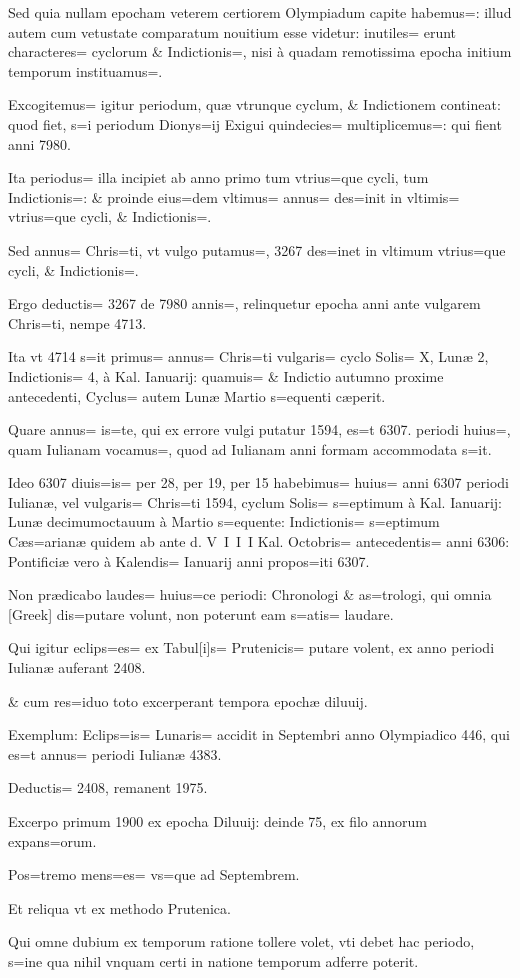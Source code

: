 \begin{parnumbers}

Sed quia nullam epocham veterem certiorem Olympiadum capite habemus=: illud autem  cum vetustate comparatum nouitium esse videtur: inutiles= erunt characteres= cyclorum \& Indictionis=, nisi à quadam remotissima epocha initium temporum instituamus=.

Excogitemus= igitur periodum, quæ vtrunque cyclum, \& Indictionem contineat: quod fiet, s=i periodum Dionys=ij Exigui quindecies= multiplicemus=: qui fient anni 7980.

Ita periodus= illa incipiet ab anno primo tum vtrius=que cycli, tum Indictionis=: \& proinde eius=dem vltimus= annus= des=init in vltimis= vtrius=que cycli, \& Indictionis=.

Sed annus= Chris=ti, vt vulgo putamus=, 3267 des=inet in vltimum vtrius=que cycli, \& Indictionis=.

Ergo deductis= 3267 de 7980 annis=, relinquetur epocha anni ante vulgarem  Chris=ti, nempe 4713.

Ita vt 4714 s=it primus= annus= Chris=ti vulgaris= cyclo Solis= X, Lunæ 2, Indictionis= 4, à Kal. Ianuarij: quamuis= \& Indictio autumno proxime antecedenti, Cyclus= autem Lunæ Martio s=equenti cæperit.

Quare annus= is=te, qui ex errore vulgi putatur 1594, es=t 6307. periodi huius=, quam Iulianam vocamus=, quod ad Iulianam anni formam accommodata s=it.

Ideo 6307 diuis=is= per 28, per 19, per 15 habebimus= huius= anni 6307 periodi Iulianæ, vel vulgaris= Chris=ti 1594, cyclum Solis= s=eptimum à Kal. Ianuarij: Lunæ decimumoctauum à Martio s=equente: Indictionis= s=eptimum Cæs=arianæ quidem ab ante d. V I I I Kal. Octobris= antecedentis= anni 6306: Pontificiæ vero à  Kalendis= Ianuarij anni propos=iti 6307.

Non prædicabo laudes= huius=ce periodi: Chronologi \& as=trologi, qui omnia [Greek] dis=putare volunt, non poterunt eam s=atis= laudare.

Qui igitur eclips=es= ex Tabul[i]s= Prutenicis= putare volent, ex anno periodi Iulianæ auferant 2408.

\& cum res=iduo toto excerperant tempora epochæ diluuij.

Exemplum: Eclips=is= Lunaris= accidit in Septembri anno Olympiadico 446, qui es=t annus= periodi Iulianæ 4383.

Deductis= 2408, remanent 1975.

Excerpo primum 1900 ex epocha Diluuij: deinde 75, ex filo annorum expans=orum.

Pos=tremo mens=es= vs=que ad Septembrem.

Et reliqua vt ex methodo Prutenica.

Qui omne dubium ex temporum ratione tollere volet, vti debet hac periodo, s=ine qua nihil vnquam certi in natione  temporum adferre poterit.

\end{parnumbers}
